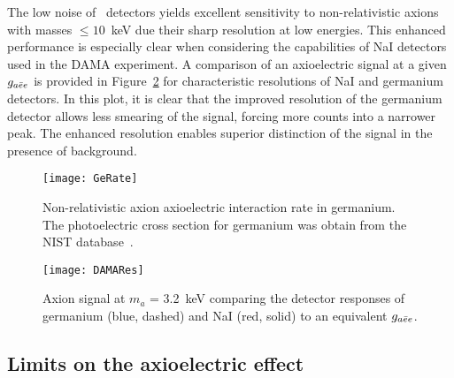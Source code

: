 The low noise of \ppc~detectors yields excellent sensitivity to non-relativistic axions with masses $\leq10$~keV due their sharp resolution at low energies.  This enhanced performance is especially clear when considering the capabilities of NaI detectors used in the DAMA experiment.  A comparison of an axioelectric signal at a given $g_{a\bar{e}e}$ is provided in Figure~\ref{fig:ResCompare} for characteristic resolutions of NaI and germanium detectors.  In this plot, it is clear that the improved resolution of the germanium detector allows less smearing of the signal, forcing more counts into a narrower peak.  The enhanced resolution enables superior distinction of the signal in the presence of background.

		\begin{figure}
			\centering
			\texttt{[image: GeRate]}
			\caption[Axioelectric interaction rate in germanium]{Non-relativistic axion axioelectric 
			interaction rate in germanium.  The photoelectric cross section for germanium was obtain
			from the NIST database~\cite{chantler:597}.}
			\label{fig:HeavyAxionSignalRate}
		\end{figure}

		\begin{figure}
			\centering
			\texttt{[image: DAMARes]}
			\caption[Axion signal at $m_{a}$ = 3.2~keV]{Axion signal at $m_{a}$ = 3.2~keV comparing 
			the detector responses of germanium (blue, dashed) and NaI (red, solid) to an equivalent
			$g_{a\bar{e}e}$.  }
			\label{fig:ResCompare}
		\end{figure}

	\subsection{Limits on the axioelectric effect}
	\label{sec:CalcLimitsOnHeavyAxionLimits}		
		
